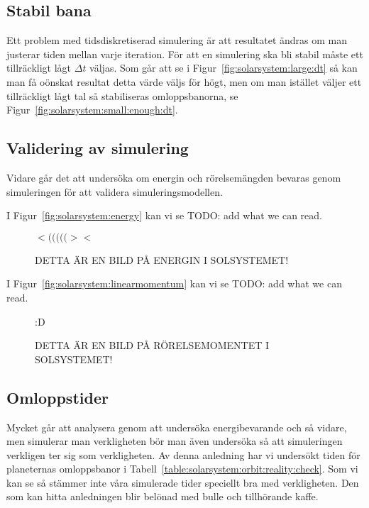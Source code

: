 \documentclass[a4]{article}
\begin{document}
		\subsection{Stabil bana}
Ett problem med tidsdiskretiserad simulering är att resultatet ändras om man
justerar tiden mellan varje iteration.
För att en simulering ska bli stabil måste ett tillräckligt lågt $\Delta t$
väljas.
Som går att se i Figur~\vref{fig:solarsystem:large:dt} så kan man få oönskat
resultat detta värde väljs för högt, men om man istället väljer ett
tillräckligt lågt tal så stabiliseras omloppsbanorna, se
Figur~\vref{fig:solarsystem:small:enough:dt}.


		\subsection{Validering av simulering}
Vidare går det att undersöka om energin och rörelsemängden
bevaras genom simuleringen för att validera
simuleringsmodellen.

I Figur~\vref{fig:solarsystem:energy} kan vi se TODO: add what we can read.
\begin{figure}
\begin{center}
$<(((((><$
\end{center}
\caption{DETTA ÄR EN BILD PÅ ENERGIN I SOLSYSTEMET!}
\label{fig:solarsystem:energy}
\end{figure}

I Figur~\vref{fig:solarsystem:linearmomentum} kan vi se TODO: add what we can read.
\begin{figure}
\begin{center}
:D
\end{center}
\caption{DETTA ÄR EN BILD PÅ RÖRELSEMOMENTET I SOLSYSTEMET!}
\label{fig:solarsystem:linearmomentum}
\end{figure}


		\subsection{Omloppstider}
Mycket går att analysera genom att undersöka energibevarande och så vidare, men
simulerar man verkligheten bör man även undersöka så att simuleringen verkligen
ter sig som verkligheten.
Av denna anledning har vi undersökt tiden för planeternas omloppsbanor i
Tabell~\vref{table:solarsystem:orbit:reality:check}.
Som vi kan se så stämmer inte våra simulerade tider speciellt bra med
verkligheten.
Den som kan hitta anledningen blir belönad med bulle och tillhörande kaffe.
\end{document}

